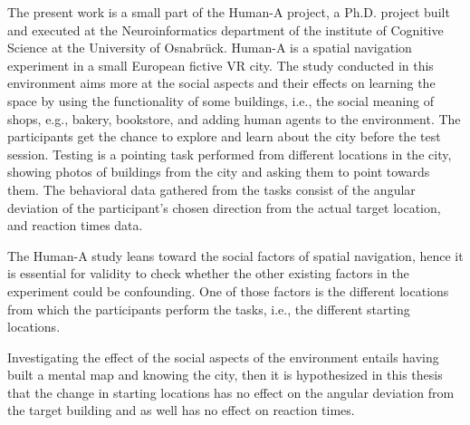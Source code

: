 The present work is a small part of the Human-A project, a Ph.D. project built and executed at the Neuroinformatics department of the institute of Cognitive Science at the University of Osnabrück. Human-A is a spatial navigation experiment in a small European fictive VR city. The study conducted in this environment aims more at the social aspects and their effects on learning the space by using the functionality of some buildings, i.e., the social meaning of shops, e.g., bakery, bookstore, and adding human agents to the environment. The participants get the chance to explore and learn about the city before the test session. Testing is a pointing task performed from different locations in the city, showing photos of buildings from the city and asking them to point towards them. The behavioral data gathered from the tasks consist of the angular deviation of the participant's chosen direction from the actual target location, and reaction times data.

The Human-A study leans toward the social factors of spatial navigation, hence it is essential for validity to check whether the other existing factors in the experiment could be confounding. One of those factors is the different locations from which the participants perform the tasks, i.e., the different starting locations. 

Investigating the effect of the social aspects of the environment entails having built a mental map and knowing the city, then it is hypothesized in this thesis that the change in starting locations has no effect on the angular deviation from the target building and as well has no effect on reaction times.

\newpage